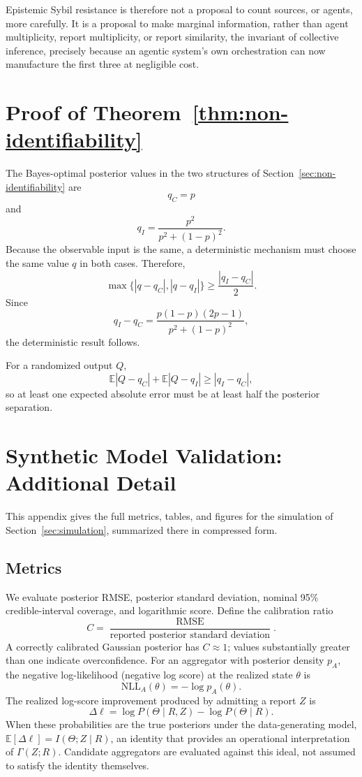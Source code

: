 \documentclass[11pt]{article}
\theoremstyle{definition}
\begin{document}
Epistemic Sybil resistance is therefore not a proposal to count sources, or agents, more carefully. It is a proposal to make marginal information, rather than agent multiplicity, report multiplicity, or report similarity, the invariant of collective inference, precisely because an agentic system's own orchestration can now manufacture the first three at negligible cost.

\appendix

\section{Proof of Theorem~\ref{thm:non-identifiability}}
\label{app:proof-nonidentifiability}

The Bayes-optimal posterior values in the two structures of Section~\ref{sec:non-identifiability} are
\[
q_C=p
\]
and
\[
q_I=
\frac{p^2}{p^2+(1-p)^2}.
\]
Because the observable input is the same, a deterministic mechanism must choose the same value $q$ in both cases. Therefore,
\[
\max\{|q-q_C|,|q-q_I|\}
\geq
\frac{|q_I-q_C|}{2}.
\]
Since
\[
q_I-q_C
=
\frac{p(1-p)(2p-1)}
{p^2+(1-p)^2},
\]
the deterministic result follows.

For a randomized output $Q$,
\[
\mathbb E|Q-q_C|
+
\mathbb E|Q-q_I|
\geq
|q_I-q_C|,
\]
so at least one expected absolute error must be at least half the posterior separation.

\section{Synthetic Model Validation: Additional Detail}
\label{app:simulation-detail}

This appendix gives the full metrics, tables, and figures for the simulation of Section~\ref{sec:simulation}, summarized there in compressed form.

\subsection{Metrics}

We evaluate posterior RMSE, posterior standard deviation, nominal 95\% credible-interval coverage, and logarithmic score. Define the calibration ratio
\[
C=
\frac{\operatorname{RMSE}}
{\text{reported posterior standard deviation}}.
\]
A correctly calibrated Gaussian posterior has $C\approx1$; values substantially greater than one indicate overconfidence. For an aggregator with posterior density $p_A$, the negative log-likelihood (negative log score) at the realized state $\theta$ is
\[
\mathrm{NLL}_A(\theta)
=
-\log p_A(\theta).
\]
The realized log-score improvement produced by admitting a report $Z$ is
\[
\Delta\ell
=
\log P(\Theta\mid R,Z)
-
\log P(\Theta\mid R).
\]
When these probabilities are the true posteriors under the data-generating model, $\mathbb E[\Delta\ell]=I(\Theta;Z\mid R)$, an identity that provides an operational interpretation of $\Gamma(Z;R)$. Candidate aggregators are evaluated against this ideal, not assumed to satisfy the identity themselves.
\end{document}
